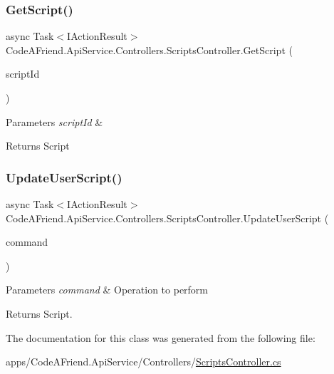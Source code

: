 \subsubsection{\texorpdfstring{Get\+Script()}{GetScript()}}
{\footnotesize\ttfamily async Task$<$I\+Action\+Result$>$ Code\+A\+Friend.\+Api\+Service.\+Controllers.\+Scripts\+Controller.\+Get\+Script (\begin{DoxyParamCaption}\item[{Guid}]{script\+Id }\end{DoxyParamCaption})}






\begin{DoxyParams}{Parameters}
{\em script\+Id} & \\
\hline
\end{DoxyParams}
\begin{DoxyReturn}{Returns}
Script
\end{DoxyReturn}
\mbox{\label{class_code_a_friend_1_1_api_service_1_1_controllers_1_1_scripts_controller_a8eb92a154466710b2f9ad5def9c11503}} 
\subsubsection{\texorpdfstring{Update\+User\+Script()}{UpdateUserScript()}}
{\footnotesize\ttfamily async Task$<$I\+Action\+Result$>$ Code\+A\+Friend.\+Api\+Service.\+Controllers.\+Scripts\+Controller.\+Update\+User\+Script (\begin{DoxyParamCaption}\item[{\mbox{\hyperlink{class_code_a_friend_1_1_data_model_1_1_user_1_1_update_script_command}{User.\+Update\+Script\+Command}}}]{command }\end{DoxyParamCaption})}






\begin{DoxyParams}{Parameters}
{\em command} & Operation to perform\\
\hline
\end{DoxyParams}
\begin{DoxyReturn}{Returns}
Script.
\end{DoxyReturn}


The documentation for this class was generated from the following file\+:\begin{DoxyCompactItemize}
\item 
apps/\+Code\+A\+Friend.\+Api\+Service/\+Controllers/\mbox{\hyperlink{_scripts_controller_8cs}{Scripts\+Controller.\+cs}}\end{DoxyCompactItemize}
